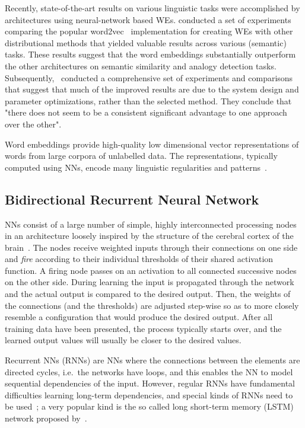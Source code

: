 \documentclass[11pt,a4paper]{article}
\begin{document}
Recently, state-of-the-art results on various linguistic tasks were accomplished by architectures using neural-network based WEs.
 conducted a set of experiments  comparing the popular word2vec~\cite{DBLP:journals/corr/abs-1301-3781,arXiv:1310.4546} implementation for creating WEs with other distributional methods that yielded valuable results across various (semantic) tasks. 
These results suggest that the word embeddings substantially outperform the other architectures on semantic similarity and analogy detection tasks.
Subsequently,~ conducted a comprehensive set of experiments and comparisons that suggest that much of the improved results are due to  the system design and parameter optimizations, rather than the selected method.  
They conclude that "there does not seem to be a consistent significant advantage to one approach over the other".

Word embeddings provide high-quality low dimensional vector representations of words from large corpora of unlabelled data. The representations, typically computed using NNs, encode many linguistic regularities and patterns~\cite{arXiv:1310.4546}.


\subsection{Bidirectional Recurrent Neural Network}  %
\label{subsec:nn}

NNs consist of a large number of simple, highly interconnected processing nodes in an architecture loosely inspired by the structure of the cerebral cortex of the brain~\cite{oreilly2000}.
The nodes receive weighted inputs through their connections on one side and \emph{fire} according to their individual thresholds of their shared activation function.
A firing node passes on an activation to all connected successive nodes on the other side.
During learning the input is propagated through the network and the actual output is compared to the desired output. 
Then, the weights of the connections (and the thresholds) are adjusted step-wise so as to more closely resemble a configuration that would produce the desired output.
After all training data have been presented, the process typically starts over, and the learned output values will usually be closer to the desired values.

Recurrent NNs (RNNs) are NNs where the connections between the elements are directed cycles, i.e.~the networks have loops, and this enables the NN to model sequential dependencies of the input.
However, regular RNNs have fundamental difficulties learning long-term dependencies, and special kinds of RNNs need to be used~\cite{Hochreiter1991}; 
a very popular kind is the so called long short-term memory (LSTM) network proposed by~.
\end{document}
